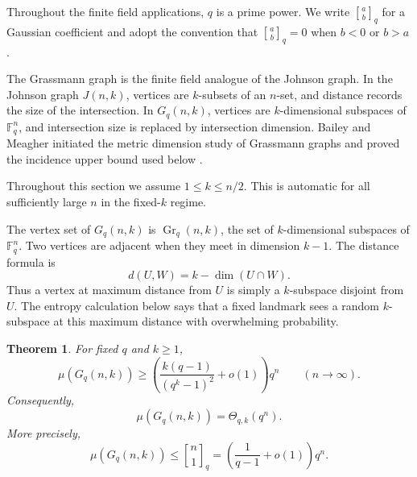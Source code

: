 \documentclass[11pt]{article}
\newtheorem{theorem}{Theorem}[section]
\theoremstyle{definition}
\theoremstyle{remark}
\newcommand{\F}{\mathbb F}
\newcommand{\Gr}{\operatorname{Gr}}
\newcommand{\qbinom}[2]{\genfrac{[}{]}{0pt}{}{#1}{#2}_q}
\begin{document}
Throughout the finite field applications, \(q\) is a prime power.  We
write \(\qbinom ab\) for a Gaussian coefficient and adopt the convention
that \(\qbinom ab=0\) when \(b<0\) or \(b>a\).

The Grassmann graph is the finite field analogue of the Johnson graph.  In 
the Johnson graph \(J(n,k)\), vertices are \(k\)-subsets of an \(n\)-set, 
and distance records the size of the intersection.  In \(G_q(n,k)\), 
vertices are \(k\)-dimensional subspaces of \(\F_q^n\), and intersection 
size is replaced by intersection dimension.  Bailey and Meagher initiated 
the metric dimension study of Grassmann graphs and proved the incidence 
upper bound used below \cite{BaileyMeagher}.

Throughout this section we assume \(1\leq k\leq n/2\).  This is automatic
for all sufficiently large \(n\) in the fixed-\(k\) regime.

The vertex set of \(G_q(n,k)\) is \(\Gr_q(n,k)\), the set of 
\(k\)-dimensional subspaces of \(\F_q^n\).  Two vertices are adjacent when 
they meet in dimension \(k-1\).  The distance formula is
\[
        d(U,W)=k-\dim(U\cap W).
\]
Thus a vertex at maximum distance from \(U\) is simply a \(k\)-subspace 
disjoint from \(U\).  The entropy calculation below says that a fixed 
landmark sees a random \(k\)-subspace at this maximum distance with 
overwhelming probability.

\begin{theorem}\label{thm:grassmann}
For fixed \(q\) and \(k\geq1\),
\[
        \mu(G_q(n,k))
        \geq
        \left(\frac{k(q-1)}{(q^k-1)^2}+o(1)\right)q^n
        \qquad (n\to\infty).
\]
Consequently,
\[
        \mu(G_q(n,k))=\Theta_{q,k}(q^n).
\]
More precisely,
\[
        \mu(G_q(n,k))
        \leq
        \qbinom n1
        =
        \left(\frac1{q-1}+o(1)\right)q^n.
\]
\end{theorem}
\end{document}

